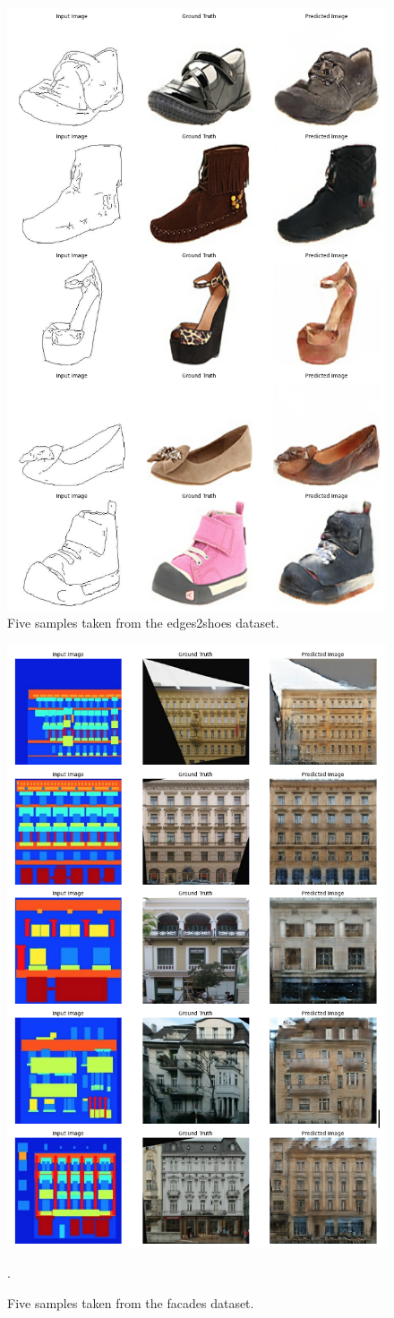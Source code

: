 \documentclass[peerreview]{IEEEtran}
\begin{document}
\begin{figure}[ht]
\centering
\includegraphics[width=0.6\columnwidth]{ex_edges2shoes.png} 
\caption{Five samples taken from the edges2shoes dataset.}
\label{fig:ex_edges2shoes}
\end{figure}

\begin{figure}[!t]
\centering
\includegraphics[width=0.6\columnwidth]{ex_facades.png} 
\caption{Five samples taken from the facades dataset.}.
\label{fig:ex_facades}
\end{figure}




\end{document}
